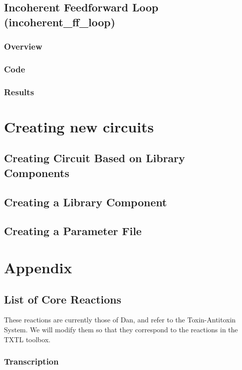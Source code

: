 \documentclass[english]{report}
\begin{document}
	\section{Incoherent Feedforward Loop (incoherent\_ff\_loop)}
		\subsection{Overview}
		\subsection{Code}
		\subsection{Results}	

\chapter{Creating new circuits}
	\section{Creating Circuit Based on Library Components}
	
	\section{Creating a Library Component}
	\section{Creating a Parameter File}


\chapter{Appendix}
	\section{List of Core Reactions}
	These reactions are currently those of Dan, and refer to the Toxin-Antitoxin System. We will modify them so that they correspond to the reactions in the TXTL toolbox. 
	\subsection{Transcription}
\end{document}
